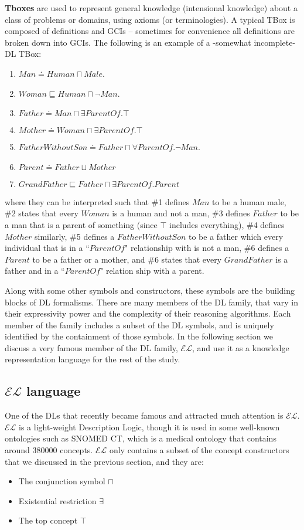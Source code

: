 \documentclass{sfuthesis}
\theoremstyle{plain}
\theoremstyle{definition}
\begin{document}
\textbf{Tboxes} are used to represent general knowledge (intensional knowledge) about a class of problems or domains, using axioms (or terminologies). A typical TBox is composed of definitions and GCIs -- sometimes for convenience all definitions are broken down into GCIs. The following is an example of a -somewhat incomplete- DL TBox:
\begin{enumerate}
\item $Man \doteq Human \sqcap Male$.
\item $Woman \sqsubseteq Human \sqcap \neg Man$.
\item $Father \doteq Man \sqcap \exists ParentOf. \top$
\item $Mother \doteq Woman \sqcap \exists ParentOf. \top$
\item $FatherWithoutSon \doteq Father \sqcap \forall ParentOf. \neg Man$.
\item $Parent \doteq Father \sqcup Mother$
\item $GrandFather \sqsubseteq Father \sqcap \exists ParentOf.Parent$
\end{enumerate}
where they can be interpreted such that \#1 defines $Man$ to be a human male, \#2 states that every $Woman$ is a human and not a man, \#3 defines $Father$ to be a man that is a parent of something (since $\top$ includes everything), \#4 defines $Mother$ similarly, \#5 defines a $FatherWithoutSon$ to be a father which every individual that is in a ``$ParentOf$" relationship with is not a man, \#6 defines a $Parent$ to be a father or a mother, and \#6 states that every $GrandFather$ is a father and in a ``$ParentOf$" relation ship with a parent.

Along with some other symbols and constructors, these symbols are the building blocks of DL formalisms. There are many members of the DL family, that vary in their expressivity power and the complexity of their reasoning algorithms. Each member of the family includes a subset of the DL symbols, and is uniquely identified by the containment of those symbols. In the following section we discuss a very famous member of the DL family, $\mathcal{EL}$, and use it as a knowledge representation language for the rest of the study.


\subsection{$\mathcal{EL}$ language}
One of the DLs that recently became famous and attracted much attention is $\mathcal{EL}$. $\mathcal{EL}$ is a light-weight Description Logic, though it is used in some well-known ontologies such as SNOMED CT, which is a medical ontology that contains around 380000 concepts\cite{new}. $\mathcal{EL}$ only contains a subset of the concept constructors that we discussed in the previous section, and they are:
\begin{itemize}
\item The conjunction symbol $\sqcap$
\item Existential restriction $\exists$
\item The top concept $\top$
\end{itemize}
\end{document}
